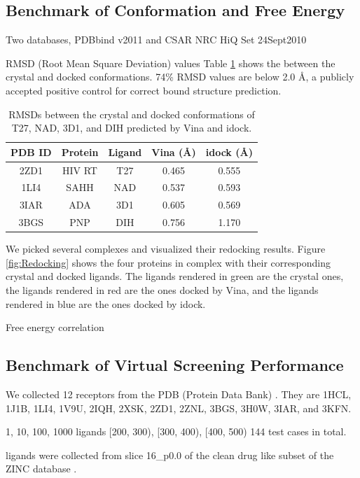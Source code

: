 \documentclass[10pt,conference,compsocconf]{../IEEEtran}
\begin{document}
\subsection{Benchmark of Conformation and Free Energy}

Two databases, PDBbind v2011 and CSAR NRC HiQ Set 24Sept2010

RMSD (Root Mean Square Deviation) values
Table \ref{tab:RMSD} shows the  between the crystal and docked conformations. 74\% RMSD values are below 2.0 \AA, a publicly accepted positive control for correct bound structure prediction.

\begin{table}
\centering
\begin{tabular*}
{\linewidth}
{@{\extracolsep{\fill}}ccccc}
\toprule
PDB ID & Protein & Ligand & Vina (\AA) & idock (\AA)\\
\midrule
2ZD1 & HIV RT & T27 & 0.465 & 0.555\\
1LI4 & SAHH   & NAD & 0.537 & 0.593\\
3IAR & ADA    & 3D1 & 0.605 & 0.569\\
3BGS & PNP    & DIH & 0.756 & 1.170\\
\bottomrule
\end{tabular*}
\caption{RMSDs between the crystal and docked conformations of T27, NAD, 3D1, and DIH predicted by Vina and idock.}
\label{tab:RMSD}
\end{table}

We picked several complexes and visualized their redocking results. Figure \ref{fig:Redocking} shows the four proteins in complex with their corresponding crystal and docked ligands. The ligands rendered in green are the crystal ones, the ligands rendered in red are the ones docked by Vina, and the ligands rendered in blue are the ones docked by idock.

Free energy correlation

\subsection{Benchmark of Virtual Screening Performance}

We collected 12 receptors from the PDB (Protein Data Bank) \cite{540,537}. They are 1HCL, 1J1B, 1LI4, 1V9U, 2IQH, 2XSK, 2ZD1, 2ZNL, 3BGS, 3H0W, 3IAR, and 3KFN.

1, 10, 100, 1000 ligands
[200, 300), [300, 400), [400, 500)
144 test cases in total.

ligands were collected from slice 16\_p0.0 of the clean drug like subset of the ZINC database \cite{532}.
\end{document}
